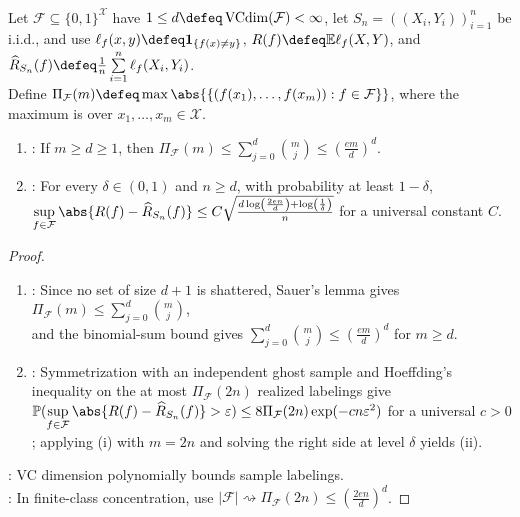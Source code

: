 \begin{theorem} \label{thm:sl-vc-generalization-form} \\
Let $\mathcal{F}\subseteq\{0,1\}^{\mathcal{X}}$ have $1\leq d\defeq\operatorname{VCdim}(\mathcal{F})<\infty$, let $S_n=((X_i,Y_i))_{i=1}^n$ be i.i.d., and use $\ell_f(x,y)\defeq\mathbf{1}_{\{f(x)\neq y\}}$, $R(f)\defeq\mathbb{E}\ell_f(X,Y)$, and $\widehat{R}_{S_n}(f)\defeq \frac{1}{n}\sum\limits_{i=1}^n\ell_f(X_i,Y_i)$.\\
Define $\Pi_{\mathcal{F}}(m)\defeq\max\abs{\{(f(x_1),\ldots,f(x_m)):f\in\mathcal{F}\}}$, where the maximum is over $x_1,\ldots,x_m\in\mathcal{X}$.
\begin{enumerate}[label=(\roman*)]
\setlength{\itemsep}{0pt}
\item {}: If $m\geq d\geq1$, then $\Pi_{\mathcal{F}}(m)\leq\sum\limits_{j=0}^{d}\binom{m}{j}\leq\left(\frac{em}{d}\right)^d$.
\item {}: For every $\delta\in(0,1)$ and $n\geq d$, with probability at least $1-\delta$,\\
$\sup\limits_{f\in\mathcal{F}}\abs{R(f)-\widehat{R}_{S_n}(f)}\leq C\sqrt{\frac{d\log\left(\frac{2en}{d}\right)+\log\left(\frac{1}{\delta}\right)}{n}}$ for a universal constant $C$.
\end{enumerate}
\end{theorem}

\begin{proof}
\begin{enumerate}[label=(\roman*)]
\setlength{\itemsep}{0pt}
\item {}: Since no set of size $d+1$ is shattered, Sauer's lemma gives $\Pi_{\mathcal{F}}(m)\leq\sum\limits_{j=0}^{d}\binom{m}{j}$,\\
and the binomial-sum bound gives $\sum\limits_{j=0}^{d}\binom{m}{j}\leq\left(\frac{em}{d}\right)^d$ for $m\geq d$.
\item {}: Symmetrization with an independent ghost sample and Hoeffding's inequality on the at most $\Pi_{\mathcal{F}}(2n)$ realized labelings give $\mathbb{P}(\sup\limits_{f\in\mathcal{F}}\abs{R(f)-\widehat{R}_{S_n}(f)}>\varepsilon)\leq8\Pi_{\mathcal{F}}(2n)\exp(-c n\varepsilon^2)$ for a universal $c>0$; applying (i) with $m=2n$ and solving the right side at level $\delta$ yields (ii).
\end{enumerate}
: VC dimension polynomially bounds sample labelings.\\
: In finite-class concentration, use $|\mathcal{F}|\rightsquigarrow\Pi_{\mathcal{F}}(2n)\leq\left(\frac{2en}{d}\right)^d$.
\end{proof}


